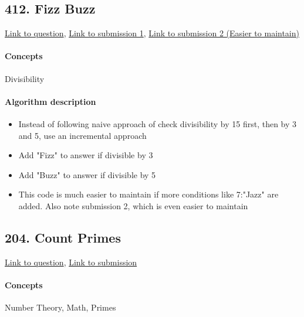 \documentclass[11pt]{book}
\begin{document}
\subsection{412. Fizz Buzz}
\href{https://leetcode.com/problems/fizz-buzz/}{Link to question},
\href{https://leetcode.com/submissions/detail/335686182/}{Link to submission 1},
\href{https://leetcode.com/submissions/detail/335700407/}{Link to submission 2 (Easier to maintain)}
\paragraph{Concepts}
Divisibility
\paragraph{Algorithm description}
\begin{itemize}
    \item Instead of following naive approach of check divisibility by 15 first, then by 3 and 5, use an incremental approach
    \item Add "Fizz" to answer if divisible by 3
    \item Add "Buzz" to answer if divisible by 5
    \item This code is much easier to maintain if more conditions like 7:"Jazz" are added. Also note submission 2, which is
        even easier to maintain
\end{itemize}

\subsection{204. Count Primes}
\href{https://leetcode.com/problems/count-primes/}{Link to question},
\href{https://leetcode.com/submissions/detail/335711052/}{Link to submission}
\paragraph{Concepts}
Number Theory, Math, Primes
\end{document}
